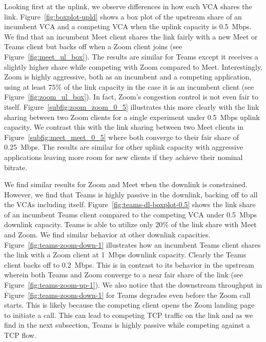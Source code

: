 Looking first at the uplink, we observe differences in how each VCA shares the link. Figure~\ref{fig:boxplot-upld} shows a box plot of the upstream share of an incumbent VCA and a competing VCA when the uplink capacity is 0.5~Mbps.  We find that an incumbent Meet client shares the link fairly with a new Meet or Teams client but backs off when a Zoom client joins (see Figure~\ref{fig:meet_ul_box}). The results are similar for Teams except it receives a slightly higher share while competing with Zoom compared to Meet. Interestingly, Zoom is highly aggressive, both as an incumbent and a competing application, using at least $75\%$ of the link capacity in the case it is an incumbent client (see Figure~\ref{fig:zoom_ul_box}). In fact, Zoom's congestion control is not even fair to itself. Figure~\ref{subfig:zoom_zoom_0_5} illustrates this more clearly with the link sharing between two Zoom clients for a single experiment under 0.5~Mbps uplink capacity. We contrast this with the link sharing between two Meet clients in Figure~\ref{subfig:meet_meet_0_5} where both converge to their fair share of 0.25~Mbps. The results are similar for other uplink capacity with aggressive applications leaving more room for new clients if they achieve their nominal bitrate.  %

We find similar results for Zoom and Meet when the downlink is constrained. However, we find that Teams is highly passive in the downlink, backing off to all the VCAs including itself. Figure~\ref{fig:teams-dl-boxplot-0.5} shows the link share of an incumbent Teams client compared to the competing VCA under 0.5~Mbps downlink capacity. Teams is able to utilize only 20\% of the link share with Meet and Zoom. We find similar behavior at other downlink capacities. Figure~\ref{fig:teams-zoom-down-1} illustrates how an incumbent Teams client shares the link with a Zoom client at 1~Mbps downlink capacity. Clearly the Teams client backs off to 0.2~Mbps. This is in contrast to its behavior in the upstream wherein both Teams and Zoom converge to a near fair share of the link (see Figure~\ref{fig:teams-zoom-up-1}). We also notice that the downstream throughput in Figure~\ref{fig:teams-zoom-down-1} for Teams degrades even before the Zoom call starts. This is likely because the competing client opens the Zoom landing page to initiate a call. This can lead to competing TCP traffic on the link and as we find in the next subsection, Teams is highly passive while competing against a TCP flow. %



